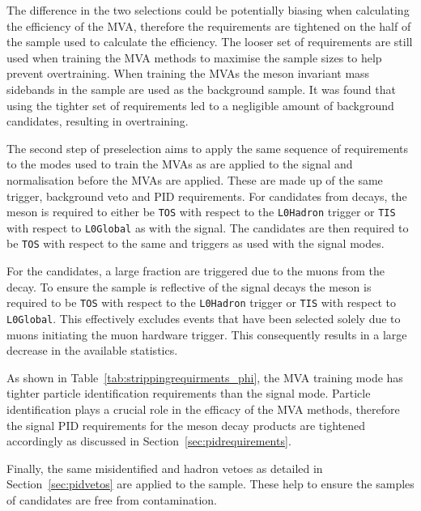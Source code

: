 The difference in the two selections could be potentially biasing when calculating the efficiency of the MVA, therefore the requirements are tightened on the half of the \decay{\Bs}{\jpsi\phiz} sample used to calculate the efficiency. The looser set of requirements are still used when training the MVA methods to maximise the sample sizes to help prevent overtraining. When training the MVAs the \phiz meson invariant mass sidebands in the \decay{\Bs}{\jpsi\phiz} sample are used as the background sample. It was found that using the tighter set of requirements led to a negligible amount of background candidates, resulting in overtraining. 


The second step of preselection aims to apply the same sequence of requirements to the modes used to train the MVAs as are applied to the signal and normalisation before the MVAs are applied. These are made up of the same trigger, background veto and PID requirements.
For \Dsp candidates from \decay{\Bsb}{\Dsp\pim} decays, the \Bsb meson is required to either be \texttt{TOS} with respect to the \texttt{L0Hadron} trigger or \texttt{TIS} with respect to \texttt{L0Global} as with the signal. The \Bsb candidates are then required to be \texttt{TOS} with respect to the same \hltone and \hlttwo triggers as used with the signal modes.

For the \decay{\Bs}{\jpsi\phiz} candidates, a large fraction are triggered due to the muons from the \jpsi decay. To ensure the sample is reflective of the signal decays the \Bs meson is required to be \texttt{TOS} with respect to the \texttt{L0Hadron} trigger or \texttt{TIS} with respect to \texttt{L0Global}. This effectively excludes events that have been selected solely due to muons initiating the muon hardware trigger. This consequently results in a large decrease in the available statistics.

As shown in Table~\ref{tab:strippingrequirments_phi}, the MVA training mode has tighter particle identification requirements than the signal mode. Particle identification plays a crucial role in the efficacy of the MVA methods, therefore the signal PID requirements for the \phiz meson decay products are tightened accordingly as discussed in Section~\ref{sec:pidrequirements}.

Finally, the same misidentified \D and \Lc hadron vetoes as detailed in Section~\ref{sec:pidvetos} are applied to the \decay{\Bsb}{\Dsp\pim} sample. These help to ensure the samples of \Dsp candidates are free from contamination.


